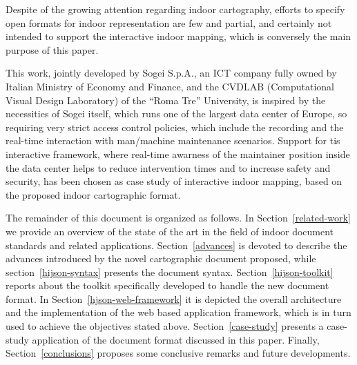 Despite of the growing attention regarding indoor cartography, efforts to specify
open formats for indoor representation are few and partial, and certainly not
intended to support the interactive indoor mapping, which is conversely the
main purpose of this paper.

This work, jointly developed by Sogei S.p.A., an ICT company fully owned by
Italian  Ministry of Economy and Finance, and the CVDLAB (Computational
Visual Design Laboratory) of the ``Roma Tre'' University, is inspired by the
necessities of Sogei itself, which runs one of the largest data center of
Europe, so requiring very strict access control policies, which include the recording and 
the real-time interaction with man/machine maintenance scenarios. Support for
tis interactive framework, where real-time awarness of the maintainer position inside
the data center helps to reduce intervention times and to increase safety and security, has
been chosen as case study of interactive indoor mapping, based on the proposed
indoor cartographic format.


The remainder of this document is organized as follows. In
Section~\ref{related-work} we provide an overview of the state of the art in
the field of indoor document standards and related applications.
Section~\ref{advances} is devoted to describe the advances introduced by the
novel cartographic document proposed, while section~\ref{hijson-syntax}
presents the document syntax. Section~\ref{hijson-toolkit} reports about the
toolkit specifically developed to handle the new document format. In
Section~\ref{hjson-web-framework} it is depicted the overall architecture and
the implementation of the web based application framework, which is in turn
used to achieve the objectives stated above. Section~\ref{case-study} presents
a case-study application of the document format discussed in this paper.
Finally, Section~\ref{conclusions} proposes some conclusive remarks and future
developments.


